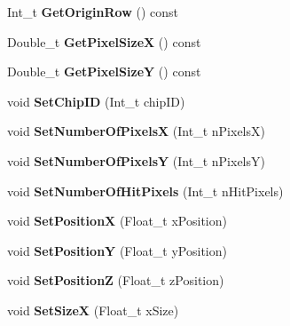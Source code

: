 \begin{DoxyCompactItemize}
Int\+\_\+t {\bfseries Get\+Origin\+Row} () const
\item 
\mbox{\label{class_alpide_chip_af03936d0a380506bb9a893cd88ba42da}} 
Double\+\_\+t {\bfseries Get\+Pixel\+SizeX} () const
\item 
\mbox{\label{class_alpide_chip_a5866e6bf00d37b60acaf7de3bce2c681}} 
Double\+\_\+t {\bfseries Get\+Pixel\+SizeY} () const
\item 
\mbox{\label{class_alpide_chip_a7870659402d0f693100083a1f50f65fb}} 
void {\bfseries Set\+Chip\+ID} (Int\+\_\+t chip\+ID)
\item 
\mbox{\label{class_alpide_chip_ad4499363fc850f0f35ea188516fafb69}} 
void {\bfseries Set\+Number\+Of\+PixelsX} (Int\+\_\+t n\+PixelsX)
\item 
\mbox{\label{class_alpide_chip_a1fc034718d54e1a16bfa83a5da559961}} 
void {\bfseries Set\+Number\+Of\+PixelsY} (Int\+\_\+t n\+PixelsY)
\item 
\mbox{\label{class_alpide_chip_ab19f727bac37650c8bbf4fb00a7d3691}} 
void {\bfseries Set\+Number\+Of\+Hit\+Pixels} (Int\+\_\+t n\+Hit\+Pixels)
\item 
\mbox{\label{class_alpide_chip_ace84e19980533e95cf9c8f3bde45c671}} 
void {\bfseries Set\+PositionX} (Float\+\_\+t x\+Position)
\item 
\mbox{\label{class_alpide_chip_ab75304136deab8b87f670cd00ceda3b0}} 
void {\bfseries Set\+PositionY} (Float\+\_\+t y\+Position)
\item 
\mbox{\label{class_alpide_chip_a36af337accbf79dc0f0459d726a307d8}} 
void {\bfseries Set\+PositionZ} (Float\+\_\+t z\+Position)
\item 
\mbox{\label{class_alpide_chip_a0643c1386f818737074a65aed5466a65}} 
void {\bfseries Set\+SizeX} (Float\+\_\+t x\+Size)
\item 
\mbox{\label{class_alpide_chip_a0e3ea65ee1717efedd3c2a9caa8a704e}} 

\end{DoxyCompactItemize}
